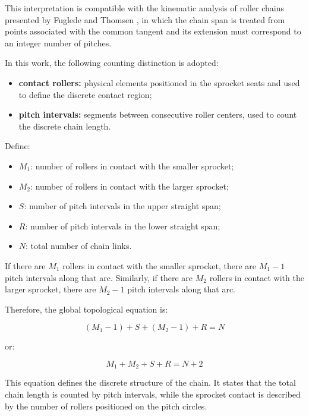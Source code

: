 \documentclass[12pt,a4paper]{article}
\begin{document}
This interpretation is compatible with the kinematic analysis of roller chains presented by Fuglede and Thomsen \cite{fuglede2016mmt}, in which the chain span is treated from points associated with the common tangent and its extension must correspond to an integer number of pitches.

In this work, the following counting distinction is adopted:

\begin{itemize}
    \item \textbf{contact rollers:} physical elements positioned in the sprocket seats and used to define the discrete contact region;
    \item \textbf{pitch intervals:} segments between consecutive roller centers, used to count the discrete chain length.
\end{itemize}

Define:

\begin{itemize}
    \item $M_1$: number of rollers in contact with the smaller sprocket;
    \item $M_2$: number of rollers in contact with the larger sprocket;
    \item $S$: number of pitch intervals in the upper straight span;
    \item $R$: number of pitch intervals in the lower straight span;
    \item $N$: total number of chain links.
\end{itemize}

If there are $M_1$ rollers in contact with the smaller sprocket, there are $M_1-1$ pitch intervals along that arc. Similarly, if there are $M_2$ rollers in contact with the larger sprocket, there are $M_2-1$ pitch intervals along that arc.

Therefore, the global topological equation is:

\begin{equation}
(M_1-1)+S+(M_2-1)+R=N
\label{eq:topological_closure}
\end{equation}

or:

\begin{equation}
M_1+M_2+S+R=N+2
\end{equation}

This equation defines the discrete structure of the chain. It states that the total chain length is counted by pitch intervals, while the sprocket contact is described by the number of rollers positioned on the pitch circles.
\end{document}
